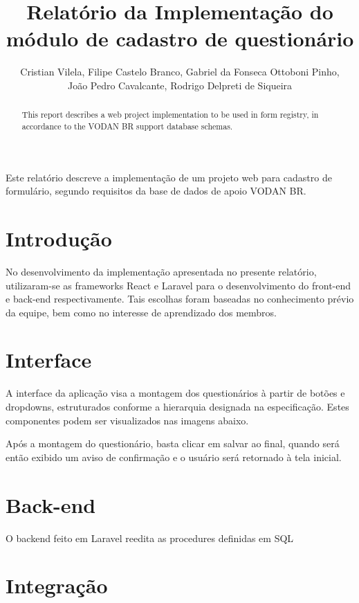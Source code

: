 \documentclass[12pt]{article}
\title{Relatório da Implementação do módulo
	de cadastro de questionário }
\author{
	Cristian Vilela\inst{1},
	Filipe Castelo Branco\inst{1},
	Gabriel da Fonseca Ottoboni Pinho\inst{1},\\
	João Pedro Cavalcante\inst{1},
	Rodrigo Delpreti de Siqueira\inst{1}
}
\begin{document}
 

\maketitle

\begin{abstract}
  This report describes a web project implementation
  to be used in form registry, in accordance to the
  VODAN BR support database schemas.
\end{abstract}
     
\begin{resumo} 
  Este relatório descreve a implementação
  de um projeto web
  para cadastro de formulário,
  segundo requisitos da base de dados
  de apoio VODAN BR.
\end{resumo}


\section{Introdução}

No desenvolvimento da implementação
apresentada no presente relatório,
utilizaram-se as frameworks React e Laravel
para o desenvolvimento do front-end e back-end
respectivamente.
Tais escolhas foram baseadas no conhecimento prévio
da equipe, bem como no interesse de aprendizado dos membros.

\section{Interface} \label{sec:firstpage}

A interface da aplicação visa a montagem
dos questionários à partir de botões e dropdowns,
estruturados conforme a hierarquia designada na especificação.
Estes componentes podem ser visualizados nas imagens abaixo.

Após a montagem do questionário,
basta clicar em salvar ao final,
quando será então exibido um aviso de confirmação
e o usuário será retornado à tela inicial.

\section{Back-end}

O backend feito em Laravel reedita as procedures
definidas em SQL

\section{Integração}
\end{document}
